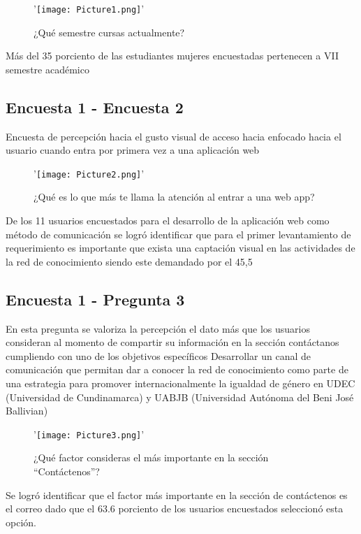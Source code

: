 \documentclass[hidelinks]{Documento}
\begin{document}
\begin{figure}[h]
\centering
'\texttt{[image: Picture1.png]}'
\caption{¿Qué semestre cursas actualmente?}
\label{fig:Picture1.png}
\end{figure}

Más del 35 porciento de las estudiantes mujeres encuestadas pertenecen a VII semestre académico 

\subsection{Encuesta 1 - Encuesta 2}

Encuesta de percepción hacia el gusto visual de acceso hacia enfocado hacia el usuario cuando entra por primera vez a una aplicación web


\begin{figure}[h]
\centering
'\texttt{[image: Picture2.png]}'
\caption{¿Qué es lo que más te llama la atención al entrar a una web app?}
\label{fig:Picture2.png}
\end{figure}


De los 11 usuarios encuestados para el desarrollo de la aplicación web como método de comunicación se logró identificar que para el primer levantamiento de requerimiento es importante que exista una captación visual en las actividades de la red de conocimiento siendo este demandado por el 45,5%


\subsection{Encuesta 1 - Pregunta 3}

En esta pregunta se valoriza la percepción el dato más que los usuarios consideran al momento de compartir su información en la sección contáctanos cumpliendo con uno de los objetivos específicos Desarrollar un canal de comunicación que permitan dar a conocer la red de conocimiento como parte de una estrategia para promover internacionalmente la igualdad de género en UDEC (Universidad de Cundinamarca) y UABJB (Universidad Autónoma del Beni José Ballivian)

\begin{figure}[h]
\centering
'\texttt{[image: Picture3.png]}'
\caption{¿Qué factor consideras el más importante en la sección “Contáctenos”?}
\label{fig:Picture3.png}
\end{figure}

Se logró identificar que el factor más importante en la sección de contáctenos es el correo dado que el 63.6 porciento de los usuarios encuestados seleccionó esta opción.
\end{document}
